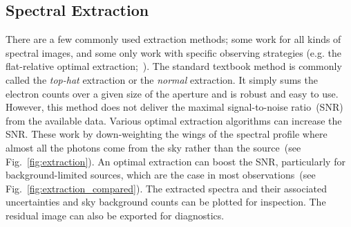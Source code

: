 \documentclass[linenumbers, twocolumn]{aastex631}
\begin{document}
\subsection{Spectral Extraction}
\label{sec:extract}
There are a few commonly used extraction methods; some work for
all kinds of spectral images, and some only work with specific
observing strategies (e.g. the flat-relative optimal
extraction;~\citealt{2014A&A...561A..59Z}). The standard textbook
method is commonly called the \textit{top-hat} extraction or the
\textit{normal} extraction. It simply sums the electron counts over
a given size of the aperture and is robust and easy to use. However,
this method does not deliver the maximal signal-to-noise ratio~(SNR)
from the available data. Various optimal extraction algorithms
can increase the SNR. These work by down-weighting the wings of the
spectral profile where almost all the photons come from the sky
rather than the source~(see Fig.~\ref{fig:extraction}). An optimal
extraction can boost the SNR, particularly for background-limited
sources, which are the case in most observations~(see
Fig.~\ref{fig:extraction_compared}). The extracted spectra and their
associated uncertainties and sky background counts can be plotted
for inspection. The residual image can also be exported for diagnostics.
\end{document}
